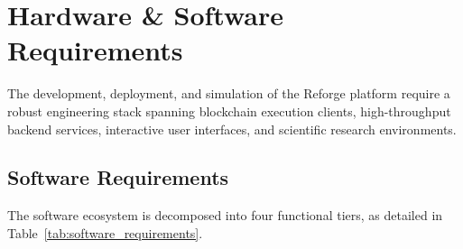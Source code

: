 \chapter{Hardware \& Software Requirements}
\label{chap:requirements}

The development, deployment, and simulation of the Reforge platform require a robust engineering stack spanning blockchain execution clients, high-throughput backend services, interactive user interfaces, and scientific research environments.

\section{Software Requirements}
The software ecosystem is decomposed into four functional tiers, as detailed in Table~\ref{tab:software_requirements}.

